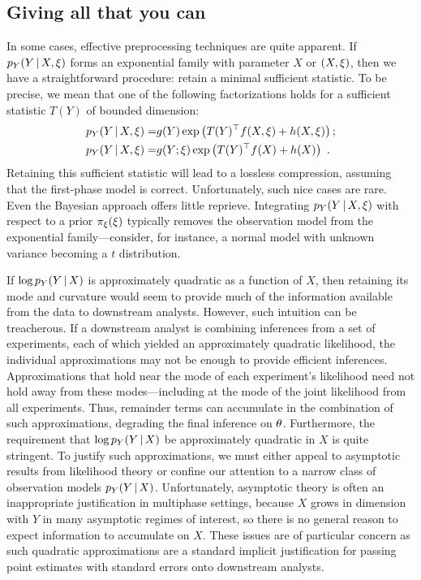 \subsection{Giving all that you can}
\label{multiphase:sec:completeclass}

In some cases, effective preprocessing techniques are quite apparent.
If $p_Y(Y \, | \, X, \xi)$ forms an exponential family with parameter $X$ or $(X, \xi)$, then we have a straightforward procedure: retain a minimal sufficient statistic.
To be precise, we mean that one of the following factorizations holds for a sufficient statistic $T(Y)$ of bounded dimension:
\begin{align}
 \nonumber
 p_Y(Y \, | \, X, \xi) =& g(Y) \exp\left(T(Y)^\top f(X, \xi) + h(X, \xi)\right);\\
 \nonumber
 p_Y(Y \, | \, X, \xi) =& g(Y; \xi) \exp\left(T(Y)^\top f(X) + h(X)\right)\ .
\end{align}
Retaining this sufficient statistic will lead to a lossless compression,  assuming that the first-phase model is correct.
Unfortunately, such nice cases are rare.
Even the Bayesian approach offers little reprieve.
Integrating $p_Y(Y \, | \, X, \xi)$ with respect to a prior $\pi_{\xi}(\xi)$ typically removes the observation model from the exponential family---consider, for instance, a normal model with unknown variance becoming a $t$ distribution.

If $\log p_Y(Y \, | \, X)$ is approximately quadratic as a function of $X$, then retaining its mode and curvature would seem to provide much of the information available from the data to downstream analysts.
However, such intuition can be treacherous.
If a downstream analyst is combining inferences from a set of experiments, each of which yielded an approximately quadratic likelihood, the individual approximations may not be enough to provide efficient inferences.
Approximations that hold near the mode of each experiment's likelihood need not hold away from these modes---including at the mode of the joint likelihood from all experiments.
Thus, remainder terms can accumulate in the combination of such approximations, degrading the final inference on $\theta$.
Furthermore, the requirement that $\log p_Y(Y \, | \, X)$ be approximately quadratic in $X$ is quite stringent.
To justify such approximations, we must either appeal to asymptotic results from likelihood theory or confine our attention to a narrow class of observation models $p_Y(Y \, | \, X)$.
Unfortunately, asymptotic theory is often an inappropriate justification in multiphase settings, because 
$X$ grows in dimension with $Y$ in many asymptotic regimes of interest, so there is no general reason to expect information to accumulate on $X$.
These issues are of particular concern as such quadratic approximations are a standard implicit justification for passing point estimates with standard errors onto downstream analysts.


